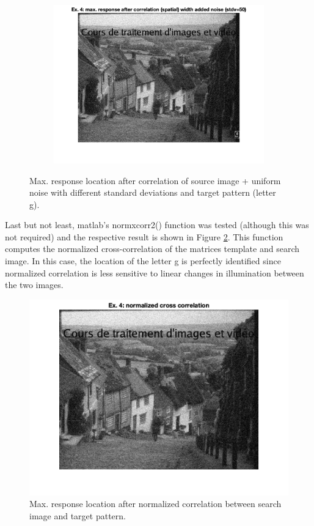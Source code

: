 \documentclass{article}
\begin{document}
\begin{figure}
\begin{subfigure}[c]{0.3\textwidth}
    \end{subfigure}
    \begin{subfigure}[c]{0.3\textwidth}
        \includegraphics[width=\textwidth]{images/corr_spatial_noise_50.png}
    \end{subfigure}
    \caption{Max. response location after correlation of source image + uniform noise with different standard deviations and target pattern (letter g).}
    \label{fig:correlation_noise}
\end{figure}

Last but not least, matlab's normxcorr2() function was tested (although this was not required) and the respective result is shown in Figure \ref{fig:correlation_norm}. This function computes the normalized cross-correlation of the matrices template and search image. In this case, the location of the letter g is perfectly identified since normalized correlation is less sensitive to linear changes in illumination between the two images.

\begin{figure}
    \centering
    \includegraphics[width=0.6 \textwidth]{images/corr_normalized.png}
    \caption{Max. response location after normalized correlation between search image and target pattern.}
    \label{fig:correlation_norm}
\end{figure}
\end{document}
